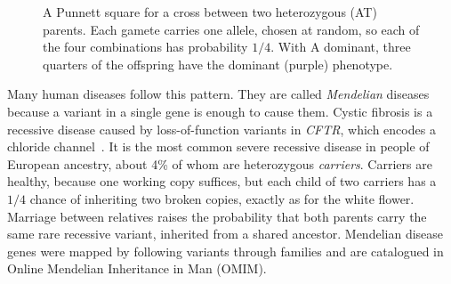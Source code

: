 \begin{figure}[!htbp]
  \centering
  \caption{A Punnett square for a cross between two heterozygous (AT) parents. Each gamete carries one allele, chosen at random, so each of the four combinations has probability $1/4$. With A dominant, three quarters of the offspring have the dominant (purple) phenotype.}
  \label{fig:punnett}
\end{figure}

Many human diseases follow this pattern. They are called \emph{Mendelian} diseases because a variant in a single gene is enough to cause them. Cystic fibrosis is a recessive disease caused by loss-of-function variants in \textit{CFTR}, which encodes a chloride channel~\citep{riordan1989}. It is the most common severe recessive disease in people of European ancestry, about 4\% of whom are heterozygous \emph{carriers}. Carriers are healthy, because one working copy suffices, but each child of two carriers has a $1/4$ chance of inheriting two broken copies, exactly as for the white flower. Marriage between relatives raises the probability that both parents carry the same rare recessive variant, inherited from a shared ancestor. Mendelian disease genes were mapped by following variants through families and are catalogued in Online Mendelian Inheritance in Man (OMIM).

